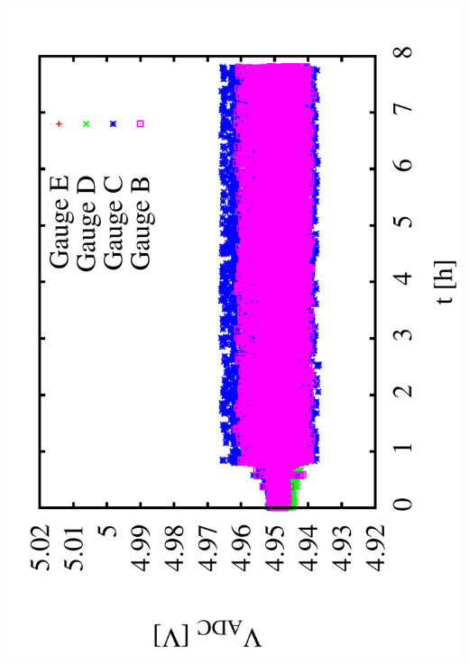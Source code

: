 \documentclass[a4paper,11pt]{book}
\begin{document}
 \hspace*{2cm}\includegraphics[angle=-90,scale=0.15]{image_ai_21a.pdf}
\end{document}
